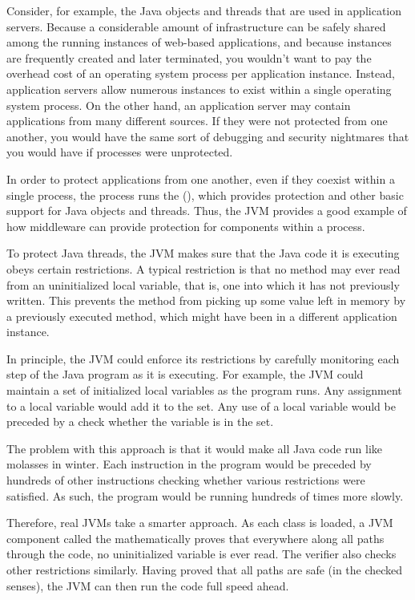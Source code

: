Consider, for example, the Java objects and threads that are used in application
servers.  Because a considerable amount of infrastructure can be safely shared
among the running instances of
web-based applications, and because instances are frequently created and later terminated,
you wouldn't want to pay the overhead cost of an
operating system process per application instance.  Instead, application servers
allow numerous instances to exist
within a single operating system process.  On the other hand, an
application server may contain applications
from many different sources.  If they were not protected from one
another, you would have the same sort of debugging and security
nightmares that you would have if processes were unprotected.

In order to protect applications from one another, even if they
coexist within a single process, the process runs the  (), which provides protection and other
basic support for Java objects and threads.  Thus, the JVM provides a good example
of how middleware can provide protection for components within a
process.

To protect Java threads, the JVM makes sure that the
Java code it is executing obeys certain restrictions.  A typical restriction is that no
method may ever read from an uninitialized local variable, that is, one
into which it has not previously written.  This prevents the method
from picking up some value left in memory by a previously executed
method, which might have been in a different application instance. 

In principle, the JVM could enforce its restrictions by carefully
monitoring each step of the Java program as it is executing.  For
example, the JVM could maintain a set of initialized local variables
as the program runs.  Any assignment to a local variable would add
it to the set.  Any use of a local variable would be preceded by a
check whether the variable is in the set.

The problem with this approach is that it would make all Java code run
like molasses in winter.  Each instruction in the program would be
preceded by hundreds of other instructions checking whether various
restrictions were satisfied.  As such, the program would be running
hundreds of times more slowly.

Therefore, real JVMs take a smarter approach.  As each class is
loaded, a JVM component called the 
mathematically proves that everywhere along all paths through the code,
no uninitialized variable is ever read.  The verifier also checks
other restrictions similarly.  Having proved that all paths are safe (in the checked
senses), the JVM can then run the code full speed ahead.


